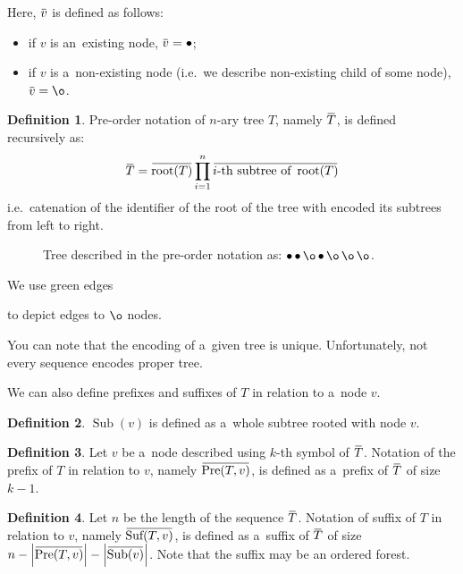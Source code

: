 \documentclass[final]{article}
\theoremstyle{definition}
\newtheorem{definition}{Definition}[subsection]
\theoremstyle{definition}
\theoremstyle{remark}
\newcommand{\ols}[1]{\mskip.5\thinmuskip\overline{\mskip-.5\thinmuskip {#1} \mskip-.5\thinmuskip}\mskip.5\thinmuskip} %
\newcommand{\enc}[1]{\ensuremath{\ols{#1}}}
\newcommand{\size}[1]{\ensuremath{\left|#1\right|}}
\DeclareMathOperator{\troot}{\text{root}}
\DeclareMathOperator{\tSub}{\text{Sub}}
\DeclareMathOperator{\tPre}{\text{Pre}}
\DeclareMathOperator{\tSuf}{\text{Suf}}
\DeclareMathOperator{\n}{\bullet}
\DeclareMathOperator{\no}{\o}
\begin{document}
Here, \(\enc{v}\) is defined as follows:
\begin{itemize}
    \item if \(v\) is an~existing node, \(\enc{v} = \n\);
    \item if \(v\) is a~non-existing node (i.e.~we describe non-existing child of some node), \(\enc{v} = \no\).
\end{itemize}

\begin{definition}
    Pre-order notation of \(n\)-ary tree \(T\), namely \(\enc{T}\), is defined recursively as:
    \[\enc{T} = \enc{\troot(T)} \prod_{i=1}^{n} \enc{i\text{-th subtree of } \troot(T)}\]
    i.e.~catenation of the identifier of the root of the tree with encoded its subtrees from left to right.
\end{definition}

\begin{figure}[H]
    \centering
    
    \caption{Tree described in the pre-order notation as: \(\n \n \no \n \no \no \no\).}%
    \label{fig:oononnn}
\end{figure}

We use green edges 
\begin{minipage}{1.5em}

\end{minipage}
to depict edges to \(\no\) nodes.

You can note that the encoding of a~given tree is unique. Unfortunately, not every sequence encodes proper tree.

We can also define prefixes and suffixes of \(T\) in relation to a~node \(v\).

\begin{definition}
    \(\tSub(v)\) is defined as a~whole subtree rooted with node \(v\).
\end{definition}

\begin{definition}
    Let \(v\) be a~node described using \(k\)-th symbol of \(\enc{T}\). Notation of the prefix of \(T\) in relation to \(v\), namely \(\enc{\tPre(T, v)}\), is defined as a~prefix of \enc{T} of size \(k - 1\).
\end{definition}

\begin{definition}
    Let \(n\) be the length of the sequence \(\enc{T}\). Notation of suffix of \(T\) in relation to \(v\), namely \(\enc{\tSuf(T, v)}\), is defined as a~suffix of \enc{T} of size \(n - \size{\enc{\tPre(T, v)}} - \size{\enc{\tSub(v)}}\). Note that the suffix may be an ordered forest.
\end{definition}
\end{document}

